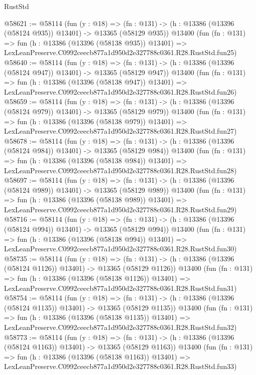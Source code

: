 \begin{lexlean}{RustStd}
\begin{coremodule}
@58621 := @58114
    (fun (y : @18) =>
    (fn : @131) -> (h : @13386 (@13396 (@58124 @935)) @13401) -> @13365 (@58129 @935))
    @13400
    (fun (fn : @131) =>
    fun (h : @13386 (@13396 (@58138 @935)) @13401) =>
    LexLeanPreserve.C0992ceecb877a1d950d2e327788c0361.R28.RustStd.fun25)
@58640 := @58114
    (fun (y : @18) =>
    (fn : @131) -> (h : @13386 (@13396 (@58124 @947)) @13401) -> @13365 (@58129 @947))
    @13400
    (fun (fn : @131) =>
    fun (h : @13386 (@13396 (@58138 @947)) @13401) =>
    LexLeanPreserve.C0992ceecb877a1d950d2e327788c0361.R28.RustStd.fun26)
@58659 := @58114
    (fun (y : @18) =>
    (fn : @131) -> (h : @13386 (@13396 (@58124 @979)) @13401) -> @13365 (@58129 @979))
    @13400
    (fun (fn : @131) =>
    fun (h : @13386 (@13396 (@58138 @979)) @13401) =>
    LexLeanPreserve.C0992ceecb877a1d950d2e327788c0361.R28.RustStd.fun27)
@58678 := @58114
    (fun (y : @18) =>
    (fn : @131) -> (h : @13386 (@13396 (@58124 @984)) @13401) -> @13365 (@58129 @984))
    @13400
    (fun (fn : @131) =>
    fun (h : @13386 (@13396 (@58138 @984)) @13401) =>
    LexLeanPreserve.C0992ceecb877a1d950d2e327788c0361.R28.RustStd.fun28)
@58697 := @58114
    (fun (y : @18) =>
    (fn : @131) -> (h : @13386 (@13396 (@58124 @989)) @13401) -> @13365 (@58129 @989))
    @13400
    (fun (fn : @131) =>
    fun (h : @13386 (@13396 (@58138 @989)) @13401) =>
    LexLeanPreserve.C0992ceecb877a1d950d2e327788c0361.R28.RustStd.fun29)
@58716 := @58114
    (fun (y : @18) =>
    (fn : @131) -> (h : @13386 (@13396 (@58124 @994)) @13401) -> @13365 (@58129 @994))
    @13400
    (fun (fn : @131) =>
    fun (h : @13386 (@13396 (@58138 @994)) @13401) =>
    LexLeanPreserve.C0992ceecb877a1d950d2e327788c0361.R28.RustStd.fun30)
@58735 := @58114
    (fun (y : @18) =>
    (fn : @131) -> (h : @13386 (@13396 (@58124 @1126)) @13401) -> @13365 (@58129 @1126))
    @13400
    (fun (fn : @131) =>
    fun (h : @13386 (@13396 (@58138 @1126)) @13401) =>
    LexLeanPreserve.C0992ceecb877a1d950d2e327788c0361.R28.RustStd.fun31)
@58754 := @58114
    (fun (y : @18) =>
    (fn : @131) -> (h : @13386 (@13396 (@58124 @1135)) @13401) -> @13365 (@58129 @1135))
    @13400
    (fun (fn : @131) =>
    fun (h : @13386 (@13396 (@58138 @1135)) @13401) =>
    LexLeanPreserve.C0992ceecb877a1d950d2e327788c0361.R28.RustStd.fun32)
@58773 := @58114
    (fun (y : @18) =>
    (fn : @131) -> (h : @13386 (@13396 (@58124 @1163)) @13401) -> @13365 (@58129 @1163))
    @13400
    (fun (fn : @131) =>
    fun (h : @13386 (@13396 (@58138 @1163)) @13401) =>
    LexLeanPreserve.C0992ceecb877a1d950d2e327788c0361.R28.RustStd.fun33)

\end{coremodule}
\end{lexlean}
